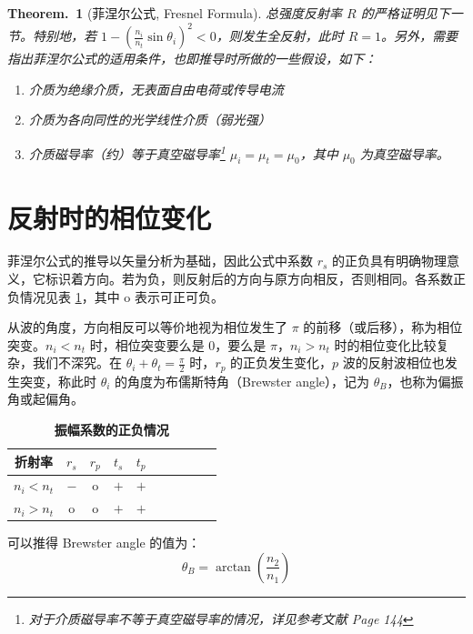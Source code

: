 \documentclass[UTF8]{report}
\theoremstyle{MyLineTheoremStyle} %
\theoremstyle{MyBlockTheoremStyle} %
\newtheorem{BlockTheorem}[LineTheorem]{Theorem.\,} %
\theoremstyle{MySubsubsectionStyle} %
\begin{document}
\begin{BlockTheorem}[菲涅尔公式, Fresnel Formula]
总强度反射率 $R$ 的严格证明见下一节。特别地，若 $1 - \left( \frac{n_i}{n_t} \sin \theta_i\right)^2 < 0$，则发生全反射，此时 $R = 1$。另外，需要指出菲涅尔公式的适用条件，也即推导时所做的一些假设，如下：
\begin{enumerate}
\item 介质为绝缘介质，无表面自由电荷或传导电流
\item 介质为各向同性的光学线性介质（弱光强）
\item 介质磁导率（约）等于真空磁导率\footnote{对于介质磁导率不等于真空磁导率的情况，详见参考文献 \cite{Optics} Page 144} $\mu_i = \mu_t = \mu_0$，其中 $\mu_0$ 为真空磁导率。
\end{enumerate}
\end{BlockTheorem}

\section{反射时的相位变化}

菲涅尔公式的推导以矢量分析为基础，因此公式中系数 $r_s$ 的正负具有明确物理意义，它标识着方向。若为负，则反射后的方向与原方向相反，否则相同。各系数正负情况见表 \ref{振幅系数的正负情况}，其中 o 表示可正可负。


\begin{center}\noindent\begin{minipage}{0.65\columnwidth}
    \hspace*{2em} 从波的角度，方向相反可以等价地视为相位发生了 $\pi$ 的前移（或后移），称为相位突变。$n_i < n_t$ 时，相位突变要么是 0，要么是 $\pi$，$n_i > n_t$ 时的相位变化比较复杂，我们不深究。在 $\theta_i + \theta_t = \frac{\pi}{2}$ 时，$r_p$ 的正负发生变化，$p$ 波的反射波相位也发生突变，称此时 $\theta_i$ 的角度为布儒斯特角（Brewster angle），记为 $\theta_B$，也称为偏振角或起偏角。
\end{minipage}\hfill\begin{minipage}{0.3\columnwidth}
    \begin{table}[H]\centering
            \caption{\textbf{振幅系数的正负情况}}
            \label{振幅系数的正负情况}
        \begin{tabular}{cccccccccc}\toprule
            折射率 & $r_s$& $r_p$ & $t_s$ & $t_p$\\
            \midrule                        
            $n_i < n_t$ & $-$ & o & $+$ & $+$\\
            $n_i > n_t$ & o & o & $+$ & $+$\\
            \bottomrule
        \end{tabular}
    \end{table}
\end{minipage}\end{center}
可以推得 Brewster angle 的值为：
\begin{equation}
    \theta_B = \arctan \left( \frac{n_2}{n_1} \right)
\end{equation}
\end{document}
